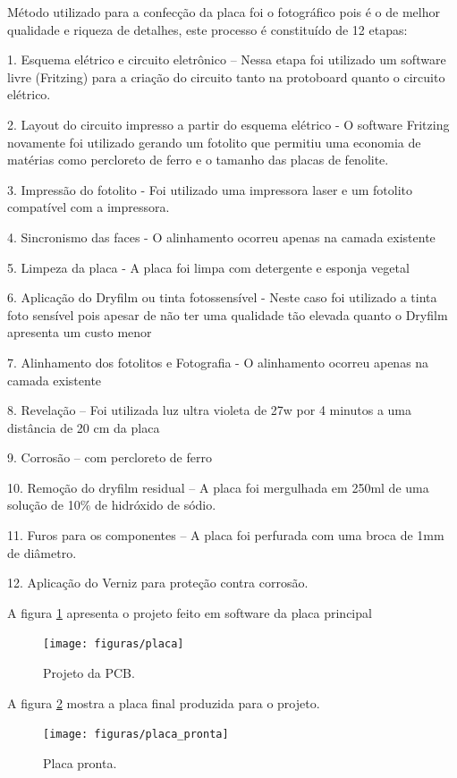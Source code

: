 Método utilizado para a confecção da placa foi o fotográfico pois é o de melhor qualidade e riqueza de detalhes, este processo é constituído de 12 etapas:

1. Esquema elétrico e circuito eletrônico – Nessa etapa foi utilizado um software livre (Fritzing) para a criação do circuito tanto na protoboard quanto o circuito elétrico.


2. Layout do circuito impresso a partir do esquema elétrico -  O software Fritzing novamente foi utilizado gerando um fotolito que permitiu uma economia de matérias como percloreto de ferro e o tamanho das placas de fenolite.

3. Impressão do fotolito -  Foi utilizado uma impressora laser e um fotolito compatível com a impressora.

4. Sincronismo das faces - O alinhamento ocorreu apenas na camada existente

5. Limpeza da placa - A placa foi limpa com detergente e esponja vegetal

6. Aplicação do Dryfilm ou tinta fotossensível -  Neste caso foi utilizado a tinta foto sensível pois apesar de não ter uma qualidade tão elevada quanto o Dryfilm apresenta um custo menor

7. Alinhamento dos fotolitos e Fotografia - O alinhamento ocorreu apenas na camada existente

8. Revelação – Foi utilizada luz ultra violeta de 27w por 4 minutos a uma distância de 20 cm da placa

9. Corrosão – com percloreto de ferro

10. Remoção do dryfilm residual – A placa foi mergulhada em 250ml de uma solução de 10\% de hidróxido de sódio.

11. Furos para os componentes – A placa foi perfurada com uma broca de 1mm de diâmetro.

12. Aplicação do Verniz para proteção contra corrosão.

A figura \ref{placa} apresenta o projeto feito em software da placa principal

\begin{figure}[h]
\centering \texttt{[image: figuras/placa]}
\caption{Projeto da PCB.}
\label{placa}
\end{figure}


A figura \ref{placapronta} mostra a placa final produzida para o projeto.

\begin{figure}[h]
\centering \texttt{[image: figuras/placa\_pronta]}
\caption{Placa pronta.}
\label{placapronta}
\end{figure}
